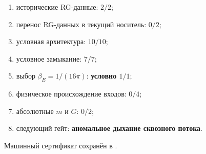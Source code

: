 \begin{protocol}\begin{enumerate}
\item исторические RG-данные: \textbf{$2/2$};
\item перенос RG-данных в текущий носитель: \textbf{$0/2$};
\item условная архитектура: \textbf{$10/10$};
\item условное замыкание: \textbf{$7/7$};
\item выбор $\beta_E=1/(16\pi)$: \textbf{условно $1/1$};
\item физическое происхождение входов: \textbf{$0/4$};
\item абсолютные $m$ и $G$: \textbf{$0/2$};
\item следующий гейт: \textbf{аномальное дыхание сквозного потока}.
\end{enumerate}\end{protocol}

Машинный сертификат сохранён в
.